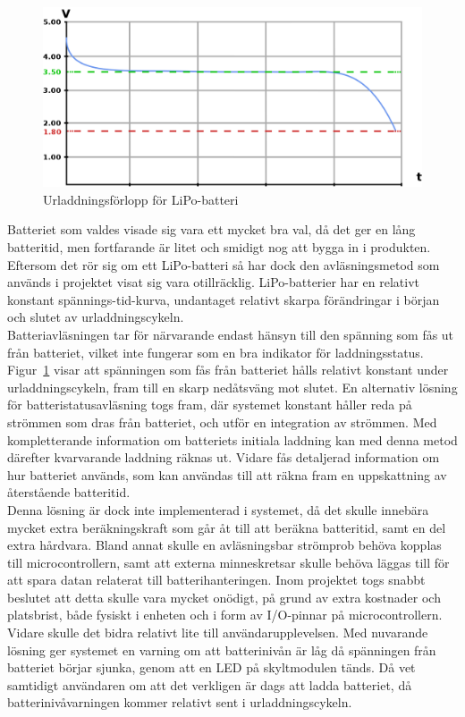 \documentclass[a4paper,11pt]{article}
\begin{document}
\begin{figure}[H]
\begin{center}
\includegraphics[scale=0.30, angle=0]{battery.png}
\end{center}
\caption{Urladdningsförlopp för LiPo-batteri}
\label{fig:batterygraph}
\end{figure}

Batteriet som valdes visade sig vara ett mycket bra val, då det ger en lång batteritid, men fortfarande är litet och smidigt nog att bygga in i produkten. Eftersom det rör sig om ett LiPo-batteri så har dock den avläsningsmetod som används i projektet visat sig vara otillräcklig. LiPo-batterier har en relativt konstant spännings-tid-kurva, undantaget relativt skarpa förändringar i början och slutet av urladdningscykeln. \\

Batteriavläsningen tar för närvarande endast hänsyn till den spänning som fås ut från batteriet, vilket inte fungerar som en bra indikator för laddningsstatus. Figur~\ref{fig:batterygraph} visar att spänningen som fås från batteriet hålls relativt konstant under urladdningscykeln, fram till en skarp nedåtsväng mot slutet. En alternativ lösning för batteristatusavläsning togs fram, där systemet konstant håller reda på strömmen som dras från batteriet, och utför en integration av strömmen. Med kompletterande information om batteriets initiala laddning kan med denna metod därefter kvarvarande laddning räknas ut. Vidare fås detaljerad information om hur batteriet används, som kan användas till att räkna fram en uppskattning av återstående batteritid. \\

Denna lösning är dock inte implementerad i systemet, då det skulle innebära mycket extra beräkningskraft som går åt till att beräkna batteritid, samt en del extra hårdvara. Bland annat skulle en avläsningsbar strömprob behöva kopplas till microcontrollern, samt att externa minneskretsar skulle behöva läggas till för att spara datan relaterat till batterihanteringen. Inom projektet togs snabbt beslutet att detta skulle vara mycket onödigt, på grund av extra kostnader och platsbrist, både fysiskt i enheten och i form av I/O-pinnar på microcontrollern. Vidare skulle det bidra relativt lite till användarupplevelsen. Med nuvarande lösning ger systemet en varning om att batterinivån är låg då spänningen från batteriet börjar sjunka, genom att en LED på skyltmodulen tänds. Då vet samtidigt användaren om att det verkligen är dags att ladda batteriet, då batterinivåvarningen kommer relativt sent i urladdningscykeln. \\
\end{document}
